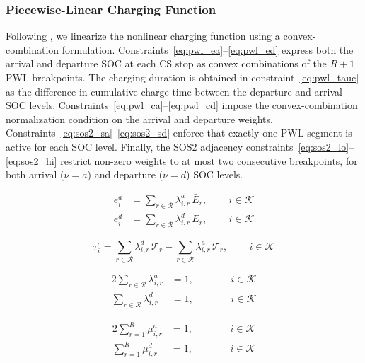 \documentclass[preprint,12pt,3p]{elsarticle}
\begin{document}
\subsubsection{Piecewise-Linear Charging Function}
Following \citet{montoya_electric_2017}, we linearize the nonlinear charging function using a convex-combination formulation. Constraints~\eqref{eq:pwl_ea}--\eqref{eq:pwl_ed} express both the arrival and departure SOC at each CS stop as convex combinations of the $R+1$ PWL breakpoints. The charging duration is obtained in constraint~\eqref{eq:pwl_tauc} as the difference in cumulative charge time between the departure and arrival SOC levels. Constraints~\eqref{eq:pwl_ca}--\eqref{eq:pwl_cd} impose the convex-combination normalization condition on the arrival and departure weights. Constraints~\eqref{eq:sos2_sa}--\eqref{eq:sos2_sd} enforce that exactly one PWL segment is active for each SOC level. Finally, the SOS2 adjacency constraints~\eqref{eq:sos2_lo}--\eqref{eq:sos2_hi} restrict non-zero weights to at most two consecutive breakpoints, for both arrival ($\nu=a$) and departure ($\nu=d$) SOC levels.

\begin{align}
    e_i^a &= \sum_{r \in \mathcal{R}} \lambda_{i,r}^{a}\,\bar{E}_r,
    \qquad \, i \in \mathcal{K} \label{eq:pwl_ea}\\
    e_i^d &= \sum_{r \in \mathcal{R}} \lambda_{i,r}^{d}\,\bar{E}_r,
    \qquad \, i \in \mathcal{K} \label{eq:pwl_ed}
\end{align}

\begin{equation}
    \tau_i^c = \sum_{r \in \mathcal{R}} \lambda_{i,r}^{d}\,\mathcal{T}_r
             - \sum_{r \in \mathcal{R}} \lambda_{i,r}^{a}\,\mathcal{T}_r,
    \qquad \, i \in \mathcal{K}
    \label{eq:pwl_tauc}
\end{equation}

\begin{alignat}{2}
    \sum_{r \in \mathcal{R}} \lambda_{i,r}^{a} &= 1, &\qquad& \, i \in \mathcal{K}
    \label{eq:pwl_ca}\\
    \sum_{r \in \mathcal{R}} \lambda_{i,r}^{d} &= 1, &\qquad& \, i \in \mathcal{K}
    \label{eq:pwl_cd}
\end{alignat}

\begin{alignat}{2}
    \sum_{r=1}^{R} \mu_{i,r}^{a} &= 1, &\qquad& \, i \in \mathcal{K}
    \label{eq:sos2_sa}\\
    \sum_{r=1}^{R} \mu_{i,r}^{d} &= 1, &\qquad& \, i \in \mathcal{K}
    \label{eq:sos2_sd}
\end{alignat}
\end{document}
